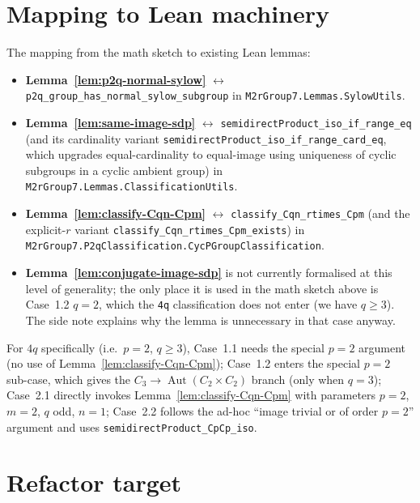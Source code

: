 \section{Mapping to Lean machinery}

The mapping from the math sketch to existing Lean lemmas:

\begin{itemize}
    \item \textbf{Lemma~\ref{lem:p2q-normal-sylow}} $\leftrightarrow$
        \texttt{p2q\_group\_has\_normal\_sylow\_subgroup} in
        \texttt{M2rGroup7.Lemmas.SylowUtils}.
    \item \textbf{Lemma~\ref{lem:same-image-sdp}} $\leftrightarrow$
        \texttt{semidirectProduct\_iso\_if\_range\_eq} (and its cardinality
        variant \texttt{semidirectProduct\_iso\_if\_range\_card\_eq}, which
        upgrades equal-cardinality to equal-image using uniqueness of cyclic
        subgroups in a cyclic ambient group) in
        \texttt{M2rGroup7.Lemmas.ClassificationUtils}.
    \item \textbf{Lemma~\ref{lem:classify-Cqn-Cpm}} $\leftrightarrow$
        \texttt{classify\_Cqn\_rtimes\_Cpm} (and the explicit-$r$ variant
        \texttt{classify\_Cqn\_rtimes\_Cpm\_exists}) in
        \texttt{M2rGroup7.P2qClassification.CycPGroupClassification}.
    \item \textbf{Lemma~\ref{lem:conjugate-image-sdp}} is not currently
        formalised at this level of generality; the only place it is used in
        the math sketch above is Case~1.2 $q = 2$, which the
        \texttt{4q} classification does not enter (we have $q \geq 3$). The
        side note explains why the lemma is unnecessary in that case anyway.
\end{itemize}

For $4q$ specifically (i.e.\ $p = 2$, $q \geq 3$), Case~1.1 needs the special
$p = 2$ argument (no use of Lemma~\ref{lem:classify-Cqn-Cpm}); Case~1.2 enters
the special $p = 2$ sub-case, which gives the $C_3 \to \operatorname{Aut}(C_2
\times C_2)$ branch (only when $q = 3$); Case~2.1 directly invokes
Lemma~\ref{lem:classify-Cqn-Cpm} with parameters $p = 2$, $m = 2$, $q$ odd,
$n = 1$; Case~2.2 follows the ad-hoc ``image trivial or of order $p = 2$''
argument and uses \texttt{semidirectProduct\_CpCp\_iso}.

\section{Refactor target}

